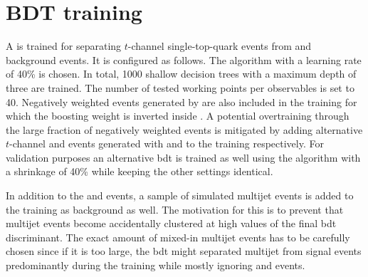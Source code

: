 

\clearpage
\section{BDT training}
\label{sec:diff13-bdt}

A \bdt is trained for separating $t$-channel single-top-quark events from \wjets and \ttbar background events. It is configured as follows. The \ADABOOST algorithm with a learning rate of 40\% is chosen. In total, 1000 shallow decision trees with a maximum depth of three are trained. The number of tested working points per observables is set to 40. Negatively weighted events generated by \MGAMC are also included in the training for which the boosting weight is inverted inside \TMVA. A potential overtraining through the large fraction of negatively weighted events is mitigated by adding alternative $t$-channel and \wjets events generated with \POWHEG and \MG to the training respectively. For validation purposes an alternative \gls{bdt} is trained as well using the \GRADIENTBOOST algorithm with a shrinkage of 40\% while keeping the other settings identical.

In addition to the \wjets and \ttbar events, a sample of simulated multijet events is added to the training as background as well. The motivation for this is to prevent that multijet events become accidentally clustered at high values of the final \gls{bdt} discriminant. The exact amount of mixed-in multijet events has to be carefully chosen since if it is too large, the \gls{bdt} might separated multijet from signal events predominantly during the training while mostly ignoring \wjets and \ttbar events.

